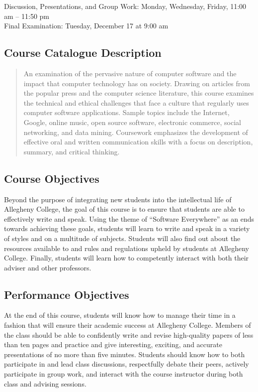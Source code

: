 Discussion, Presentations, and Group Work: Monday, Wednesday, Friday, 11:00 am -- 11:50 pm \\
Final Examination: Tuesday, December 17 at 9:00 am

\subsection*{Course Catalogue Description}

\begin{quote}

An examination of the pervasive nature of computer software and the impact that computer technology has on society.
Drawing on articles from the popular press and the computer science literature, this course examines the technical and
ethical challenges that face a culture that regularly uses computer software applications. Sample topics include the
Internet, Google, online music, open source software, electronic commerce, social networking, and data mining.
Coursework emphasizes the development of effective oral and written communication skills with a focus on description,
summary, and critical thinking.

\end{quote}

\subsection*{Course Objectives}

Beyond the purpose of integrating new students into the intellectual life of Allegheny College, the goal of this course
is to ensure that students are able to effectively write and speak.  Using the theme of ``Software Everywhere'' as an
ends towards achieving these goals, students will learn to write and speak in a variety of styles and on a multitude of
subjects.  Students will also find out about the resources available to and rules and regulations upheld by students at 
Allegheny College.  Finally, students will learn how to competently interact with both their adviser and other
professors.

\subsection*{Performance Objectives}

At the end of this course, students will know how to manage their time in a fashion that will ensure their academic
success at Allegheny College.  Members of the class should be able to confidently write and revise high-quality papers
of less than ten pages and practice and give interesting, exciting, and accurate presentations of no more than five
minutes.  Students should know how to both participate in and lead class discussions, respectfully debate their peers,
actively participate in group work, and interact with the course instructor during both class and advising sessions. 

